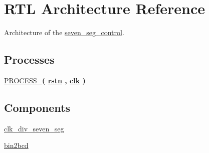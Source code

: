\hypertarget{classseven__seg__control_1_1RTL}{\section{R\-T\-L Architecture Reference}
\label{classseven__seg__control_1_1RTL}
}


Architecture of the \hyperlink{classseven__seg__control}{seven\-\_\-seg\-\_\-control}.  


\subsection*{Processes}
 \begin{DoxyCompactItemize}
\item 
\hypertarget{classseven__seg__control_1_1RTL_aac7714a16c91b177124f8e63d31d1234}{\hyperlink{classseven__seg__control_1_1RTL_aac7714a16c91b177124f8e63d31d1234}{P\-R\-O\-C\-E\-S\-S\-\_}{\bfseries  ( {\bfseries {\bfseries \hyperlink{classseven__seg__control_aba021aec4b477b89079bb58ccadcc67e}{rstn}} \textcolor{vhdlchar}{ }\textcolor{vhdlchar}{ }\textcolor{vhdlchar}{ }} , {\bfseries {\bfseries \hyperlink{classseven__seg__control_a8120037e0ee47c35ba2d79242209c72e}{clk}} \textcolor{vhdlchar}{ }} )}}\label{classseven__seg__control_1_1RTL_aac7714a16c91b177124f8e63d31d1234}

\end{DoxyCompactItemize}
\subsection*{Components}
 \begin{DoxyCompactItemize}
\item 
\hypertarget{classseven__seg__control_1_1RTL_ac37f6407a40b9c2c6331c38048caf6f9}{\hyperlink{classseven__seg__control_1_1RTL_ac37f6407a40b9c2c6331c38048caf6f9}{clk\-\_\-div\-\_\-seven\-\_\-seg}  {\bfseries }  }\label{classseven__seg__control_1_1RTL_ac37f6407a40b9c2c6331c38048caf6f9}

\item 
\hypertarget{classseven__seg__control_1_1RTL_aa2d5bf6e4dc6ef99dbc13d369781e56f}{\hyperlink{classseven__seg__control_1_1RTL_aa2d5bf6e4dc6ef99dbc13d369781e56f}{bin2bcd}  {\bfseries }  }\label{classseven__seg__control_1_1RTL_aa2d5bf6e4dc6ef99dbc13d369781e56f}

\end{DoxyCompactItemize}

